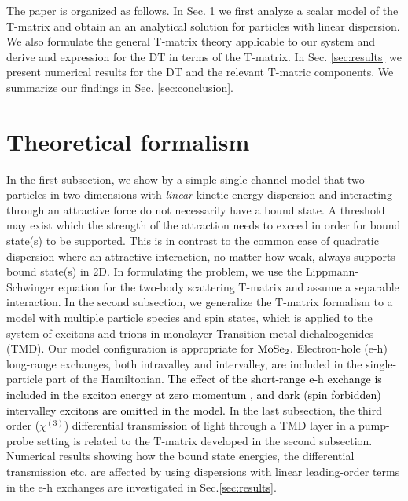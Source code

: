 \documentclass[aps,prb,superscriptaddress,letterpaper,amsmath,amssymb,twocolumn,preprintnumbers]{revtex4}
\newcommand\revisionA[1]{\textcolor{black}{#1}}
\begin{document}
The paper is organized as follows. In Sec. \ref{theory.sec} we first analyze a scalar model of the T-matrix and obtain an an analytical solution for particles with linear dispersion. We also formulate the general T-matrix theory applicable to our system and derive and expression for the DT in terms of the T-matrix.
In Sec. \ref{sec:results} we present numerical results for the DT and the relevant T-matric components. We summarize our findings in Sec. \ref{sec:conclusion}.













\section{Theoretical formalism}\label{theory.sec}
In the first subsection, we show by a simple single-channel model that two particles in two dimensions with \textit{linear} kinetic energy dispersion and interacting through an attractive force do not necessarily have a bound state. A threshold may exist which the strength of the attraction needs to exceed in order for bound state(s) to be supported. This is in contrast to the common case of quadratic dispersion where an attractive interaction, no matter how weak, always supports bound state(s) in 2D. In formulating the problem, we use the Lippmann-Schwinger equation for the two-body scattering T-matrix and assume a separable interaction. In the second subsection, we generalize the T-matrix formalism to a model with multiple particle species and spin states, which is applied to the system of excitons and trions in monolayer Transition metal dichalcogenides (TMD). Our model configuration is appropriate for ${\rm MoSe}_2$. Electron-hole (e-h) long-range exchanges, both intravalley and intervalley, are included in the single-particle part of the Hamiltonian.
\revisionA{
The effect of the short-range e-h exchange is included in the exciton energy at zero momentum \cite{qiu-etal.15}, and dark (spin forbidden) intervalley excitons are omitted in the model.
}
In the last subsection, the third order ($\chi^{(3)}$) differential transmission of light through a TMD layer in a pump-probe setting is related to the T-matrix developed in the second subsection.
Numerical results showing how the bound state energies, the differential transmission etc. are affected by using dispersions with linear leading-order terms in the e-h exchanges are investigated in Sec.\ref{sec:results}.
\end{document}
